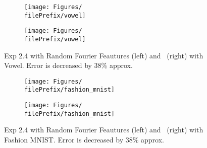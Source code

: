 \begin{figure}[H]
  \centering
  \renewcommand{\filePrefix}{\undPrefix/rff}
  \begin{subfigure}[t]{0.5\linewidth}
    \centering\captionsetup{width=.8\linewidth}\texttt{[image: Figures/\\filePrefix/vowel]}
    \label{fig:\undPrefix_vowel}
  \end{subfigure}%
  \renewcommand{\filePrefix}{\undPrefix/nys}%
  \begin{subfigure}[t]{0.5\linewidth}
    \centering\captionsetup{width=.8\linewidth}\texttt{[image: Figures/\\filePrefix/vowel]}
    \label{fig:\undPrefix_vowel}
  \end{subfigure}
  \caption*{Exp 2.4 with Random Fourier Feautures (left) and \Nys\ (right) with Vowel. Error is decreased by 38\% approx.}
\end{figure}


\begin{figure}[H]
  \centering
  \renewcommand{\filePrefix}{\undPrefix/rff}
  \begin{subfigure}[t]{0.5\linewidth}
    \centering\captionsetup{width=.8\linewidth}\texttt{[image: Figures/\\filePrefix/fashion\_mnist]}
    \label{fig:\undPrefix_vowel}
  \end{subfigure}%
  \renewcommand{\filePrefix}{\undPrefix/nys}%
  \begin{subfigure}[t]{0.5\linewidth}
    \centering\captionsetup{width=.8\linewidth}\texttt{[image: Figures/\\filePrefix/fashion\_mnist]}
    \label{fig:\undPrefix_vowel}
  \end{subfigure}
  \caption{Exp 2.4 with Random Fourier Feautures (left) and \Nys\ (right)
   with Fashion MNIST. Error is decreased by 38\% approx.}
\end{figure}




